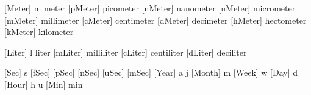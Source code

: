 
\def\Linear  {\dimensionpower{1}}
\def\Square  {\dimensionpower{2}}
\def\Cubic   {\dimensionpower{3}}

\def\Inverse {\dimensionpower{-1}}
\def\ILinear {\dimensionpower{-1}}
\def\ISquare {\dimensionpower{-2}}
\def\ICubic  {\dimensionpower{-3}}


 [Meter]  {m}             {meter}
 [pMeter] {\Pico  \Meter} {picometer}
 [nMeter] {\Nano  \Meter} {nanometer}
 [uMeter] {\Micro \Meter} {micrometer}
 [mMeter] {\Milli \Meter} {millimeter}
 [cMeter] {\Centi \Meter} {centimeter}
 [dMeter] {\Deci  \Meter} {decimeter}
 [hMeter] {\Hecto \Meter} {hectometer}
 [kMeter] {\Kilo  \Meter} {kilometer}


 [Liter]  {l}             {liter}
 [mLiter] {\Milli \Liter} {milliliter}
 [cLiter] {\Centi \Liter} {centiliter}
 [dLiter] {\Deci  \Liter} {deciliter}


 [Sec]   {s}                       {}
 [fSec]  {\Femto \Sec}             {}
 [pSec]  {\Pico \Sec}              {}
 [nSec]  {\Nano \Sec}              {}
 [uSec]  {\Micro \Sec}             {}
 [mSec]  {\Milli \Sec}             {}
 [Year]  {\ifSIunits a \else j\fi} {}
 [Month] {m}                       {}
 [Week]  {w}                       {}
 [Day]   {d}                       {}
 [Hour]  {\ifSIunits h \else u\fi} {}
 [Min]   {min}                     {}

